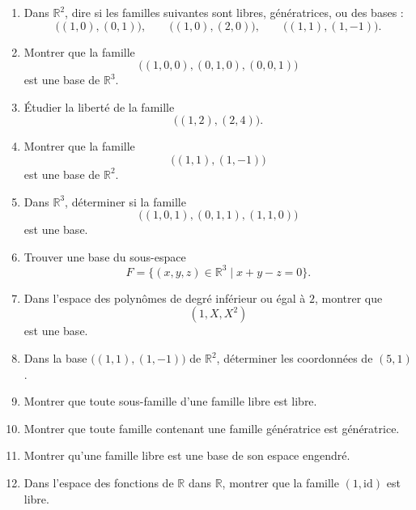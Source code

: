\documentclass[11pt,a4paper]{article}
\theoremstyle{remark}
\newcommand{\R}{\mathbb{R}}
\begin{document}
\begin{enumerate}[label=\textbf{Exercice \arabic*.}]
    \item Dans \(\R^2\), dire si les familles suivantes sont libres, génératrices, ou des bases :
    \[
    \big((1,0),(0,1)\big),\qquad
    \big((1,0),(2,0)\big),\qquad
    \big((1,1),(1,-1)\big).
    \]

    \item Montrer que la famille
    \[
    \big((1,0,0),(0,1,0),(0,0,1)\big)
    \]
    est une base de \(\R^3\).

    \item Étudier la liberté de la famille
    \[
    \big((1,2),(2,4)\big).
    \]

    \item Montrer que la famille
    \[
    \big((1,1),(1,-1)\big)
    \]
    est une base de \(\R^2\).

    \item Dans \(\R^3\), déterminer si la famille
    \[
    \big((1,0,1),(0,1,1),(1,1,0)\big)
    \]
    est une base.

    \item Trouver une base du sous-espace
    \[
    F=\{(x,y,z)\in\R^3\mid x+y-z=0\}.
    \]

    \item Dans l’espace des polynômes de degré inférieur ou égal à \(2\), montrer que
    \[
    (1,X,X^2)
    \]
    est une base.

    \item Dans la base \(\big((1,1),(1,-1)\big)\) de \(\R^2\), déterminer les coordonnées de \((5,1)\).

    \item Montrer que toute sous-famille d’une famille libre est libre.

    \item Montrer que toute famille contenant une famille génératrice est génératrice.

    \item Montrer qu’une famille libre est une base de son espace engendré.

    \item Dans l’espace des fonctions de \(\R\) dans \(\R\), montrer que la famille \((1,\mathrm{id})\) est libre.
\end{enumerate}
\end{document}
